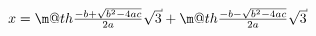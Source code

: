 \documentclass{article}
\begin{document}
\def\cuberoot#1{%
  \setbox0=\hbox{$\m@th#1\sqrtsign{3}$}%
  \dimen0=\ht0
  \advance\dimen0-0.2\ht0
  \setbox2=\hbox{\vrule height\ht0 depth -\dimen0}%
  {\box0\lower0.4pt\box2}%
}

\[
x = \cuberoot{\frac{-b + \sqrt{b^2 - 4ac}}{2a}} + \cuberoot{\frac{-b - \sqrt{b^2 - 4ac}}{2a}}
\]
\end{document}
